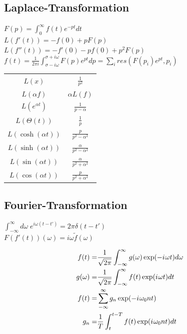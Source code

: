 \documentclass[12pt,a4paper, twoside]{article}
\newcommand{\iu}{{i\mkern1mu}}
\renewcommand{\=}[1]{\stackrel{#1}{=}}
\theoremstyle{definition}
\theoremstyle{remark}
\begin{document}
\begin{center}
\begin{minipage}[t]{.57\linewidth}
\vspace{0pt}

\subsection{Laplace-Transformation}
$F(p) = \int_0^{\infty} f(t) e^{-pt}dt$\\
$L(f'(t)) = -f(0) + p F(p)$\\
$L(f''(t)) = - f'(0) - p f(0) + p^2 F(p)$\\
$f(t) = \frac{1}{2\pi i}\int_{\sigma - i \omega}^{\sigma + i \omega} F(p) e^{pt}dp = \sum_i res (F(p_i) e^{pt}, p_i)$\\

\setlength\tabcolsep{2.5pt}
\noindent\begin{tabular}{cc}
$L(x)$ & $\frac{1}{p^2}$\\
$L(\alpha f)$ & $\alpha L(f)$\\
$L(e^{\alpha t})$ & $\frac{1}{p-\alpha}$\\
$L(\Theta(t))$ & $\frac{1}{p}$\\
$L(\cosh(\alpha t))$ & $\frac{p}{p^2 - \alpha^2}$\\
$L(\sinh(\alpha t))$ & $\frac{\alpha}{p^2 - \alpha^2}$\\
$L(\sin(\alpha t))$ & $\frac{\alpha}{p^2 + \alpha^2}$\\
$L(\cos(\alpha t))$ & $\frac{p}{p^2 + \alpha^2}$
\end{tabular}





\end{minipage}%
\begin{minipage}[t]{.43\linewidth}
\vspace{0pt}
\subsection{Fourier-Transformation}

$\int_{-\infty}^{\infty} d\omega \; e^{i\omega (t - t')} = 2\pi \delta(t-t')$\\
$F(f'(t))(\omega) = i\omega \tilde f(\omega)$\\

\begin{framed}
\begin{align*}
f(t) =& \frac{1}{\sqrt{2\pi}} \int_{-\infty}^{\infty} g(\omega) \exp(-\iu \omega t) d\omega\\
g(\omega) =& \frac{1}{\sqrt{2\pi}} \int_{-\infty}^{\infty} f(t) \exp (\iu \omega t) dt\\
f(t) =& \sum_{-\infty}^{\infty} g_n \exp(- \iu \omega_0 n t)\\
g_n =& \frac{1}{T} \int_{t}^{t-T} f(t) \exp(\iu \omega_0 n t) dt
\end{align*}
\end{framed}

\end{minipage}
\end{center}
\end{document}
